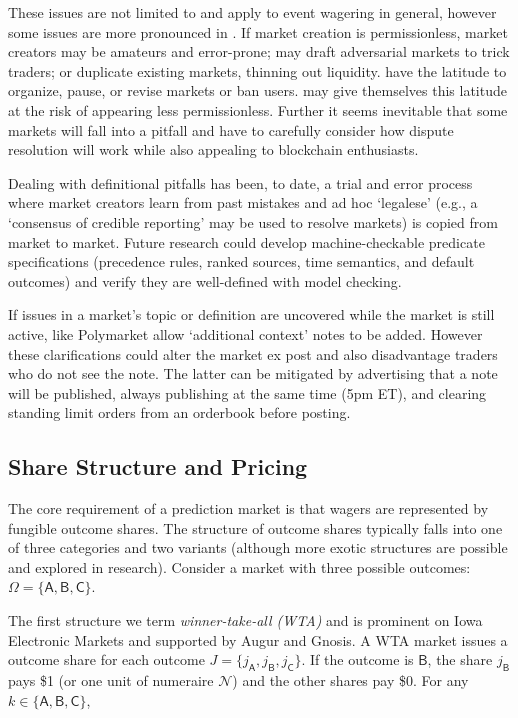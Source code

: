 These issues are not limited to \depms and apply to event wagering in general, however some issues are more pronounced in \depms. If market creation is permissionless, market creators may be amateurs and error-prone; may draft adversarial markets to trick traders; or duplicate existing markets, thinning out liquidity. \cepms have the latitude to organize, pause, or revise markets or ban users. \depms may give themselves this latitude at the risk of appearing less permissionless. Further it seems inevitable that some markets will fall into a pitfall and \depms have to carefully consider how dispute resolution will work while also appealing to blockchain enthusiasts.

Dealing with definitional pitfalls has been, to date, a trial and error process where market creators learn from past mistakes and ad hoc `legalese' (e.g., a `consensus of credible reporting' may be used to resolve markets) is copied from market to market. Future research could develop machine-checkable predicate specifications (precedence rules, ranked sources, time semantics, and default outcomes) and verify they are well-defined with model checking. 

If issues in a market's topic or definition are uncovered while the market is still active, \depms like Polymarket allow `additional context' notes to be added. However these clarifications could alter the market ex post and also disadvantage traders who do not see the note. The latter can be mitigated by advertising that a note will be published, always publishing at the same time (\eg 5pm ET), and clearing standing limit orders from an orderbook before posting.


\subsection{Share Structure and Pricing}\label{wf:mech}\label{wf:price}

The core requirement of a prediction market is that wagers are represented by fungible outcome shares. The structure of outcome shares typically falls into one of three categories and two variants (although more exotic structures are possible and explored in research). Consider a market with three possible outcomes: $\Omega=\{\mathsf{A}, \mathsf{B}, \mathsf{C}\}$. 

The first structure we term \textit{winner-take-all (WTA)} and is prominent on Iowa Electronic Markets and supported by Augur and Gnosis. A WTA market issues a outcome share for each outcome $J=\{j_\mathsf{A}, j_\mathsf{B}, j_\mathsf{C}\}$. If the outcome is $\mathsf{B}$, the share $j_\mathsf{B}$ pays \$1 (or one unit of numeraire $\mathcal{N}$) and the other shares pay \$0. For any $k\in\{\mathsf{A},\mathsf{B},\mathsf{C}\}$,

